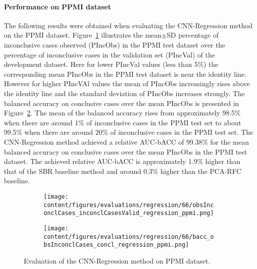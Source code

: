 
\paragraph{Performance on PPMI dataset}

The following results were obtained when evaluating the CNN-Regression method on the PPMI dataset.
Figure~\ref{fig:obsInconclCases_inconclCasesValid_regression_ppmi} illustrates the
mean$\pm$SD percentage of inconclusive cases observed (PIncObs) in the PPMI test dataset 
over the percentage of inconclusive cases in the validation set (PIncVal) of the development dataset.
Here for lower PIncVal values (less than 5\%) the corresponding mean PIncObs 
in the PPMI test dataset is near the identity line.
However for higher PIncVAl values the mean of PIncObs increasingly rises above the identity line
and the standard deviation of PIncObs increases strongly.
The balanced accuracy on conclusive cases over the mean PIncObs is presented in Figure~\ref{fig:bacc_obsInconclCases_concl_regression_ppmi}.
The mean of the balanced accuracy rises from approximately 98.5\% 
when there are around 1\% of inconclusive cases in the PPMI test set to about 99.5\% 
when there are around 20\% of inconclusive cases in the PPMI test set.
The CNN-Regression method achieved a relative AUC-bACC of 99.38\% for the mean balanced accuracy on conclusive cases 
over the mean PIncObs in the PPMI test dataset.
The achieved relative AUC-bACC is approximately 1.9\% higher than that of the SBR baseline method 
and around 0.3\% higher than the PCA-RFC baseline.


\begin{figure}[ht]
  \begin{subfigure}{0.49\textwidth}
    \centering
    \texttt{[image: content/figures/evaluations/regression/66/obsInconclCases\_inconclCasesValid\_regression\_ppmi.png]}
    \label{fig:obsInconclCases_inconclCasesValid_regression_ppmi}
  \end{subfigure}
  \hfill
  \begin{subfigure}{0.49\textwidth}
    \centering
    \texttt{[image: content/figures/evaluations/regression/66/bacc\_obsInconclCases\_concl\_regression\_ppmi.png]}
    \label{fig:bacc_obsInconclCases_concl_regression_ppmi}
  \end{subfigure}
  \caption{Evaluation of the CNN-Regression method on PPMI dataset.}
  \label{fig:perf_regression_ppmi}
\end{figure}



